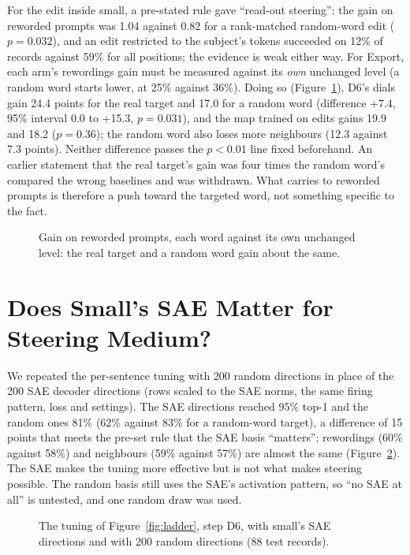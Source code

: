 For the edit inside small, a pre-stated rule gave ``read-out steering'': the gain on reworded prompts was 1.04 against 0.82 for a rank-matched random-word edit ($p=0.032$), and an edit restricted to the subject's tokens succeeded on 12\% of records against 59\% for all positions; the evidence is weak either way. For Export, each arm's rewordings gain must be measured against its \emph{own} unchanged level (a random word starts lower, at 25\% against 36\%). Doing so (Figure~\ref{fig:push}), D6's dials gain 24.4 points for the real target and 17.0 for a random word (difference +7.4, 95\% interval 0.0 to +15.3, $p=0.031$), and the map trained on edits gains 19.9 and 18.2 ($p=0.36$); the random word also loses more neighbours (12.3 against 7.3 points). Neither difference passes the $p<0.01$ line fixed beforehand. An earlier statement that the real target's gain was four times the random word's compared the wrong baselines and was withdrawn. What carries to reworded prompts is therefore a push toward the targeted word, not something specific to the fact.

\begin{figure}[t]
\centering
{}
\caption{Gain on reworded prompts, each word against its own unchanged level: the real target and a random word gain about the same.}\label{fig:push}
\end{figure}

\section{Does Small's SAE Matter for Steering Medium?}\label{sec:sae}

We repeated the per-sentence tuning with 200 random directions in place of the 200 SAE decoder directions (rows scaled to the SAE norms, the same firing pattern, loss and settings). The SAE directions reached 95\% top-1 and the random ones 81\% (62\% against 83\% for a random-word target), a difference of 15 points that meets the pre-set rule that the SAE basis ``matters''; rewordings (60\% against 58\%) and neighbours (59\% against 57\%) are almost the same (Figure~\ref{fig:sae}). The SAE makes the tuning more effective but is not what makes steering possible. The random basis still uses the SAE's activation pattern, so ``no SAE at all'' is untested, and one random draw was used.

\begin{figure}[t]
\centering
{}
\caption{The tuning of Figure~\ref{fig:ladder}, step D6, with small's SAE directions and with 200 random directions (88 test records).}\label{fig:sae}
\end{figure}

